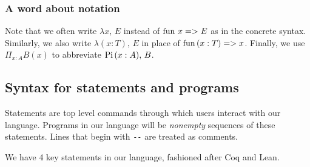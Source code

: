 \documentclass{article}
\begin{document}
\subsubsection{A word about notation}
Note that we often write $\lambda x, \, E$ instead of $\operatorname{fun} \, x => E$ as in the
concrete syntax. Similarly, we also write $\lambda (x : T), \, E$ in place of
$\operatorname{fun} \, (x : T) => x$.
Finally, we use $\Pi_{x : A}B(x)$ to abbreviate $\operatorname{Pi} \, (x : A), \, B$.

\subsection{Syntax for statements and programs}
Statements are top level commands through which users interact with our
language. Programs in our language will be \textit{nonempty} sequences of
these statements. Lines that begin with \verb|--| are treated as comments.

We have 4 key statements in our language, fashioned after Coq and Lean.
\end{document}
